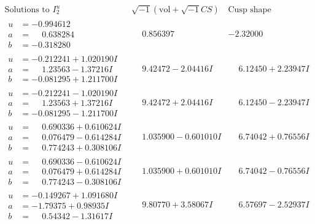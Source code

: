 \documentclass[1p]{elsarticle_modified}
\theoremstyle{definition}
\newcommand{\I}{\sqrt{-1}}
\begin{document}
$$\begin{array}{c|c|c}  
\text{Solutions to }I^u_{2}& \I (\text{vol} + \sqrt{-1}CS) & \text{Cusp shape}\\
 \hline 
\begin{aligned}
u &= -0.994612\phantom{ +0.000000I} \\
a &= \phantom{-}0.638284\phantom{ +0.000000I} \\
b &= -0.318280\phantom{ +0.000000I}\end{aligned}
 & \phantom{-}0.856397\phantom{ +0.000000I} & -2.32000\phantom{ +0.000000I} \\ \hline\begin{aligned}
u &= -0.212241 + 1.020190 I \\
a &= \phantom{-}1.23563 - 1.37216 I \\
b &= -0.081295 + 1.211700 I\end{aligned}
 & \phantom{-}9.42472 - 2.04416 I & \phantom{-}6.12450 + 2.23947 I \\ \hline\begin{aligned}
u &= -0.212241 - 1.020190 I \\
a &= \phantom{-}1.23563 + 1.37216 I \\
b &= -0.081295 - 1.211700 I\end{aligned}
 & \phantom{-}9.42472 + 2.04416 I & \phantom{-}6.12450 - 2.23947 I \\ \hline\begin{aligned}
u &= \phantom{-}0.690336 + 0.610624 I \\
a &= \phantom{-}0.076479 - 0.614284 I \\
b &= \phantom{-}0.774243 + 0.308106 I\end{aligned}
 & \phantom{-}1.035900 - 0.601010 I & \phantom{-}6.74042 + 0.76556 I \\ \hline\begin{aligned}
u &= \phantom{-}0.690336 - 0.610624 I \\
a &= \phantom{-}0.076479 + 0.614284 I \\
b &= \phantom{-}0.774243 - 0.308106 I\end{aligned}
 & \phantom{-}1.035900 + 0.601010 I & \phantom{-}6.74042 - 0.76556 I \\ \hline\begin{aligned}
u &= -0.149267 + 1.091680 I \\
a &= -1.79375 + 0.98935 I \\
b &= \phantom{-}0.54342 - 1.31617 I\end{aligned}
 & \phantom{-}9.80770 + 3.58067 I & \phantom{-}6.57697 - 2.52937 I \\ \hline\begin{aligned}

\end{aligned}
\end{array}$$
\end{document}
